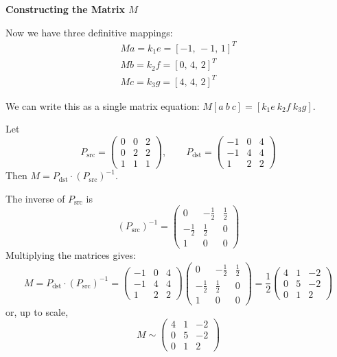 \documentclass[12pt]{article}
\begin{document}
    \textbf{Constructing the Matrix $M$}

    Now we have three definitive mappings:
    \begin{align*}
        M a = k_1 e = [-1,\,-1,\,1]^T \\
        M b = k_2 f = [0,\,4,\,2]^T \\
        M c = k_3 g = [4,\,4,\,2]^T
    \end{align*}

    We can write this as a single matrix equation: $M [a\ b\ c] = [k_1 e\ k_2 f\ k_3 g]$.

    Let
    \[
    P_{\text{src}} = \begin{pmatrix}
    0 & 0 & 2 \\
    0 & 2 & 2 \\
    1 & 1 & 1
    \end{pmatrix}, \qquad
    P_{\text{dst}} = \begin{pmatrix}
    -1 & 0 & 4 \\
    -1 & 4 & 4 \\
    1 & 2 & 2
    \end{pmatrix}
    \]
    Then $M = P_{\text{dst}} \cdot (P_{\text{src}})^{-1}$.

    The inverse of $P_{\text{src}}$ is
    \[
    (P_{\text{src}})^{-1} =
    \begin{pmatrix}
    0 & -\frac{1}{2} & \frac{1}{2} \\
    -\frac{1}{2} & \frac{1}{2} & 0 \\
    1 & 0 & 0
    \end{pmatrix}
    \]
    Multiplying the matrices gives:
    \[
    M = P_{\text{dst}} \cdot (P_{\text{src}})^{-1} =
    \begin{pmatrix}
    -1 & 0 & 4 \\
    -1 & 4 & 4 \\
    1 & 2 & 2
    \end{pmatrix}
    \begin{pmatrix}
    0 & -\frac{1}{2} & \frac{1}{2} \\
    -\frac{1}{2} & \frac{1}{2} & 0 \\
    1 & 0 & 0
    \end{pmatrix}
    = \frac{1}{2}
    \begin{pmatrix}
    4 & 1 & -2 \\
    0 & 5 & -2 \\
    0 & 1 & 2
    \end{pmatrix}
    \]   or, up to scale,
    \[
    M \sim 
    \begin{pmatrix}
    4 & 1 & -2 \\
    0 & 5 & -2 \\
    0 & 1 & 2
    \end{pmatrix}
    \]
\end{document}
